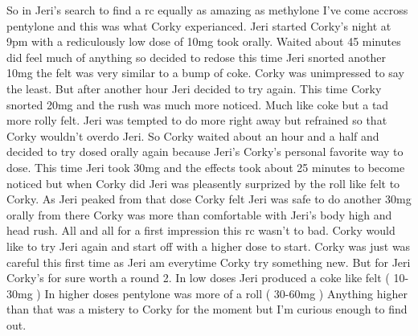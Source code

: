\documentclass[12pt]{book}
\begin{document}
So in Jeri's search to find a rc equally as amazing as methylone I've come accross pentylone and this was what Corky experianced. Jeri started Corky's night at 9pm with a rediculously low dose of 10mg took orally. Waited about 45 minutes did feel much of anything so decided to redose this time Jeri snorted another 10mg the felt was very similar to a bump of coke. Corky was unimpressed to say the least. But after another hour Jeri decided to try again. This time Corky snorted 20mg and the rush was much more noticed. Much like coke but a tad more rolly felt. Jeri was tempted to do more right away but refrained so that Corky wouldn't overdo Jeri. So Corky waited about an hour and a half and decided to try dosed orally again because Jeri's Corky's personal favorite way to dose. This time Jeri took 30mg and the effects took about 25 minutes to become noticed but when Corky did Jeri was pleasently surprized by the roll like felt to Corky. As Jeri peaked from that dose Corky felt Jeri was safe to do another 30mg orally from there Corky was more than comfortable with Jeri's body high and head rush. All and all for a first impression this rc wasn't to bad. Corky would like to try Jeri again and start off with a higher dose to start. Corky was just was careful this first time as Jeri am everytime Corky try something new. But for Jeri Corky's for sure worth a round 2. In low doses Jeri produced a coke like felt ( 10-30mg ) In higher doses pentylone was more of a roll ( 30-60mg ) Anything higher than that was a mistery to Corky for the moment but I'm curious enough to find out.
\end{document}
